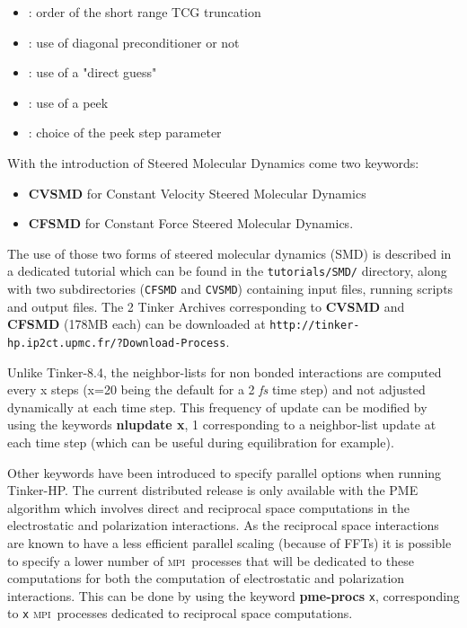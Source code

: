 \documentclass[peerreview]{IEEEtran}
\def\mpi{\textsc{mpi}}
\newlength{\mylen}
\begin{document}
\begin{itemize}
\item[] : order of the short range TCG truncation
\item[] : use of diagonal preconditioner or not
\item[] : use of a "direct guess"
\item[] : use of a peek 
\item[] : choice of the peek step parameter
\end{itemize}

\vskip5mm
With the introduction of Steered Molecular Dynamics come two keywords:
\begin{itemize}
\item[] \textbf{CVSMD} for Constant Velocity Steered Molecular Dynamics
\item[]\textbf{CFSMD} for Constant Force Steered Molecular Dynamics.
\end{itemize}

 The use of those two forms of steered molecular dynamics (SMD) is described in a dedicated tutorial which can be found in the \texttt{tutorials/SMD/} directory, along with two subdirectories (\texttt{CFSMD} and \texttt{CVSMD}) containing input files, running scripts and output files. The 2 Tinker Archives corresponding to \textbf{CVSMD} and \textbf{CFSMD} (178MB each) can be downloaded at \texttt{http://tinker-hp.ip2ct.upmc.fr/?Download-Process}.
 
\vskip5mm
Unlike Tinker-8.4, the neighbor-lists for non bonded interactions are computed every x steps (x=20 being the default for a 2 {\em fs} time step) and not adjusted dynamically at each time step. This frequency of update can be modified by using the keywords \textbf{nlupdate x}, 1 corresponding to a neighbor-list update at each time step (which can be useful during equilibration for example).

\vskip5mm
Other keywords have been introduced to specify parallel options when running Tinker-HP. The current distributed release is only available with the PME algorithm which involves direct and reciprocal space computations in the electrostatic and polarization interactions. As the reciprocal space interactions are known to have a less efficient parallel scaling (because of FFTs) it is possible to specify a lower number of \mpi\  processes that will be dedicated to these computations for both the computation of electrostatic and polarization interactions. This can be done by using the keyword \textbf{pme-procs} \texttt{x}, corresponding to \texttt{x} \mpi\  processes dedicated to reciprocal space computations.
\end{document}
